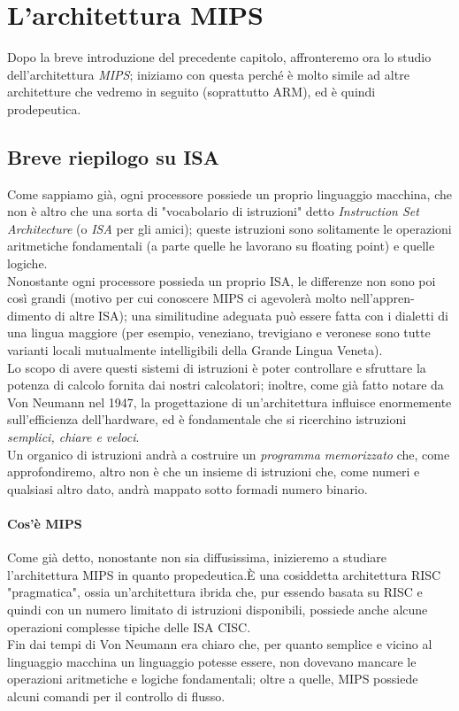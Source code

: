 \documentclass[class=book, crop=false]{standalone}
\begin{document}
\chapter{L'architettura MIPS}

Dopo la breve introduzione del precedente capitolo, affronteremo ora lo studio dell'architettura \textit{MIPS}; iniziamo con questa perché è molto simile ad altre architetture che vedremo in seguito (soprattutto ARM), ed è quindi prodepeutica.

\section{Breve riepilogo su ISA}
Come sappiamo già, ogni processore possiede un proprio linguaggio macchina, che non è altro che una sorta di "vocabolario di istruzioni" detto \emph{Instruction Set Architecture} (o \emph{ISA} per gli amici); queste istruzioni sono solitamente le operazioni aritmetiche fondamentali (a parte quelle he lavorano su floating point) e quelle logiche. \\
Nonostante ogni processore possieda un proprio ISA, le differenze non sono poi così grandi (motivo per cui conoscere MIPS ci agevolerà molto nell'appren-dimento di altre ISA); una similitudine adeguata può essere fatta con i dialetti di una lingua maggiore (per esempio, veneziano, trevigiano e veronese sono tutte varianti locali mutualmente intelligibili della Grande Lingua Veneta).\\
Lo scopo di avere questi sistemi di istruzioni è poter controllare e sfruttare la potenza di calcolo fornita dai nostri calcolatori; inoltre, come già fatto notare da Von Neumann nel 1947, la progettazione di un'architettura influisce enormemente sull'efficienza dell'hardware, ed è fondamentale che si ricerchino istruzioni \textit{semplici, chiare e veloci}.\\
Un organico di istruzioni andrà a costruire un \textit{programma memorizzato} che, come approfondiremo, altro non è che un insieme di istruzioni che, come numeri e qualsiasi altro dato, andrà mappato sotto formadi numero binario.

\subsubsection{Cos'è MIPS}
Come già detto, nonostante non sia diffusissima, inizieremo a studiare l'architettura MIPS in quanto propedeutica.È una cosiddetta architettura RISC "pragmatica", ossia un'architettura ibrida che, pur essendo basata su RISC e quindi con un numero limitato di istruzioni disponibili, possiede anche alcune operazioni complesse tipiche delle ISA CISC.\\
Fin dai tempi di Von Neumann era chiaro che, per quanto semplice e vicino al linguaggio macchina un linguaggio potesse essere, non dovevano mancare le operazioni aritmetiche e logiche fondamentali; oltre a quelle, MIPS possiede alcuni comandi per il controllo di flusso.
\end{document}
